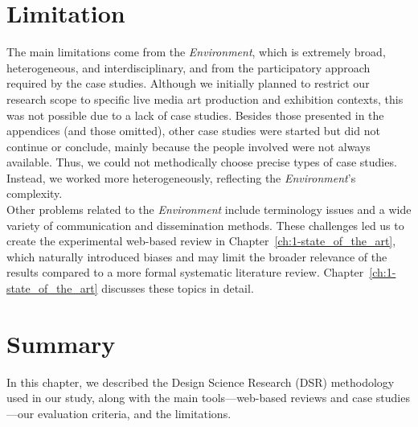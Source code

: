 \section{Limitation}
The main limitations come from the \textit{Environment}, which is extremely broad, heterogeneous, and interdisciplinary, and from the participatory approach required by the case studies. Although we initially planned to restrict our research scope to specific live media art production and exhibition contexts, this was not possible due to a lack of case studies. Besides those presented in the appendices (and those omitted), other case studies were started but did not continue or conclude, mainly because the people involved were not always available. Thus, we could not methodically choose precise types of case studies. Instead, we worked more heterogeneously, reflecting the \textit{Environment}’s complexity.\\
Other problems related to the \textit{Environment} include terminology issues and a wide variety of communication and dissemination methods. These challenges led us to create the experimental web-based review in Chapter~\ref{ch:1-state_of_the_art}, which naturally introduced biases and may limit the broader relevance of the results compared to a more formal systematic literature review. Chapter~\ref{ch:1-state_of_the_art} discusses these topics in detail.

\section{Summary}
In this chapter, we described the Design Science Research (DSR) methodology used in our study, along with the main tools—web-based reviews and case studies—our evaluation criteria, and the limitations. 

